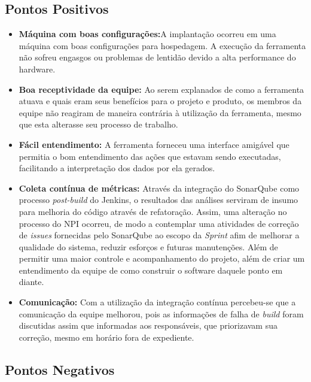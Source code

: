 \subsection{Pontos Positivos}
\begin{itemize}
\item \textbf{Máquina com boas configurações:}A implantação ocorreu em uma máquina com boas configurações para hospedagem. A execução da ferramenta não sofreu engasgos ou problemas de lentidão devido a alta performance do hardware.

\item \textbf{Boa receptividade da equipe:}
Ao serem explanados de como a ferramenta atuava e quais eram seus benefícios para o projeto e produto, os membros da equipe não reagiram de maneira contrária à utilização da ferramenta, mesmo que esta alterasse seu processo de trabalho.

\item \textbf{Fácil entendimento:}
A ferramenta forneceu uma interface amigável que permitia o bom entendimento das ações que estavam sendo executadas, facilitando a interpretação dos dados por ela gerados.

\item \textbf{Coleta contínua de métricas:}
Através da integração do SonarQube como processo \textit{post-build} do Jenkins, o resultados das análises serviram de insumo para melhoria do código através de refatoração. Assim, uma alteração no processo do NPI ocorreu, de modo a contemplar uma atividades de correção de \textit{issues} fornecidas pelo SonarQube ao escopo da \textit{Sprint} afim de melhorar a qualidade do sistema, reduzir esforços e futuras manutenções. Além de permitir uma maior controle e acompanhamento do projeto, além de criar um entendimento da equipe de como construir o software daquele ponto em diante.

\item \textbf{Comunicação:}
Com a utilização da integração contínua percebeu-se que a comunicação da equipe melhorou, pois as informações de falha de \textit{build} foram discutidas assim que informadas aos responsáveis, que priorizavam sua correção, mesmo em horário fora de expediente.

\end{itemize}
\subsection{Pontos Negativos}

